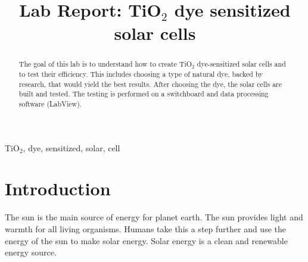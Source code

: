 \documentclass[conference]{IEEEtran}
\begin{document}
\title{Lab Report: TiO$_2$ dye sensitized solar cells}

\author{
\and
{}
\and
{}
}

\maketitle
\thispagestyle{plain}

\begin{abstract}
The goal of this lab is to understand how to create TiO$_2$ dye-sensitized solar cells and to test their efficiency. This includes choosing a type of natural dye, backed by research, that would yield the best results. After choosing the dye, the solar cells are built and tested. The testing is performed on a switchboard and data processing software (LabView). 
\\
\end{abstract}

\begin{IEEEkeywords}
TiO$_2$, dye, sensitized, solar, cell
\end{IEEEkeywords}

\section{Introduction}\label{intro}
The sun is the main source of energy for planet earth. The sun provides light and warmth for all living organisms. Humans take this a step further and use the energy of the sun to make solar energy. Solar energy is a clean and renewable energy source.
\end{document}
